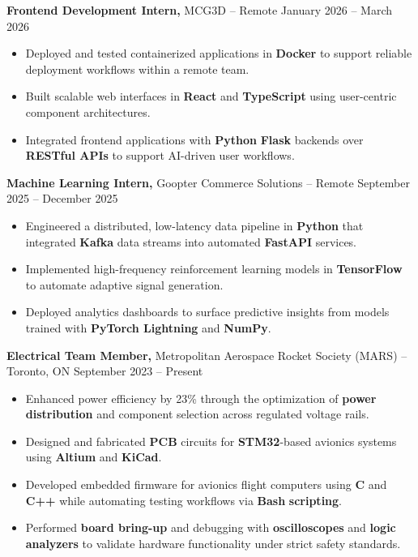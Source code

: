 \documentclass[11pt]{article}
\begin{document}
\smallskip
\textbf{Frontend Development Intern,} {MCG3D} -- Remote \hfill January 2026 -- March 2026 \\
\begin{itemize}
  \item Deployed and tested containerized applications in \textbf{Docker} to support reliable deployment workflows within a remote team.
  \item Built scalable web interfaces in \textbf{React} and \textbf{TypeScript} using user-centric component architectures.
  \item Integrated frontend applications with \textbf{Python} \textbf{Flask} backends over \textbf{RESTful APIs} to support AI-driven user workflows.
\end{itemize}

\smallskip
\textbf{Machine Learning Intern,} {Goopter Commerce Solutions} -- Remote \hfill September 2025 -- December 2025 \\
\begin{itemize}
  \item Engineered a distributed, low-latency data pipeline in \textbf{Python} that integrated \textbf{Kafka} data streams into automated \textbf{FastAPI} services.
  \item Implemented high-frequency reinforcement learning models in \textbf{TensorFlow} to automate adaptive signal generation.
  \item Deployed analytics dashboards to surface predictive insights from models trained with \textbf{PyTorch Lightning} and \textbf{NumPy}.
\end{itemize}

\smallskip
\textbf{Electrical Team Member,} {Metropolitan Aerospace Rocket Society (MARS)} -- Toronto, ON \hfill September 2023 -- Present \\
\vspace{-9pt}
\begin{itemize}
  \item Enhanced power efficiency by 23\% through the optimization of \textbf{power distribution} and component selection across regulated voltage rails.
  \item Designed and fabricated \textbf{PCB} circuits for \textbf{STM32}-based avionics systems using \textbf{Altium} and \textbf{KiCad}.
  \item Developed embedded firmware for avionics flight computers using \textbf{C} and \textbf{C++} while automating testing workflows via \textbf{Bash} \textbf{scripting}.
  \item Performed \textbf{board bring-up} and debugging with \textbf{oscilloscopes} and \textbf{logic analyzers} to validate hardware functionality under strict safety standards.
\end{itemize}
\end{document}
